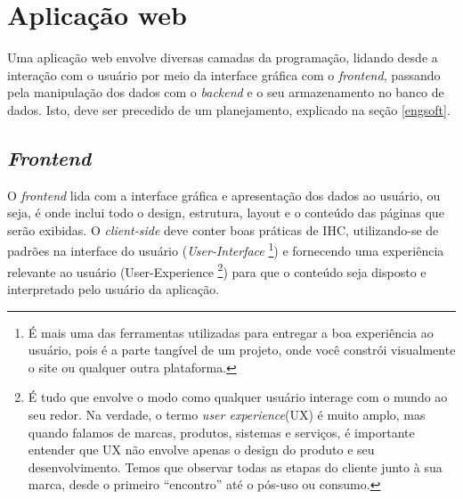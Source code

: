 
\section{Aplicação web}
Uma aplicação web envolve diversas camadas da programação, lidando desde a interação com o usuário por meio da interface gráfica com o \textit{frontend}, passando pela manipulação dos dados com o \textit{backend} e o seu armazenamento no banco de dados. Isto, deve ser precedido de um planejamento, explicado na seção \ref{engsoft}.

\subsection{\textit{Frontend}}
O \textit{frontend} lida com a interface gráfica e apresentação dos dados ao usuário, ou seja, é onde inclui todo o design, estrutura, layout e o conteúdo das páginas que serão exibidas. O \textit{client-side} deve conter boas práticas de IHC, utilizando-se de padrões na interface do usuário (\textit{User-Interface}
\footnote{É mais uma das ferramentas utilizadas para entregar a boa experiência ao usuário, pois é a parte tangível de um projeto, onde você constrói visualmente o site ou qualquer outra plataforma.}) e fornecendo uma experiência relevante ao usuário 
(User-Experience
\footnote{É tudo que envolve o modo como qualquer usuário interage com o mundo ao seu redor. Na verdade, o termo \textit{user experience}(UX) é muito amplo, mas quando falamos de marcas, produtos, sistemas e serviços, é importante entender que UX não envolve apenas o design do produto e seu desenvolvimento. Temos que observar todas as etapas do cliente junto à sua marca, desde o primeiro “encontro” até o pós-uso ou consumo.}) 
para que o conteúdo seja disposto e interpretado pelo usuário da aplicação. \cite{SOUTO}

